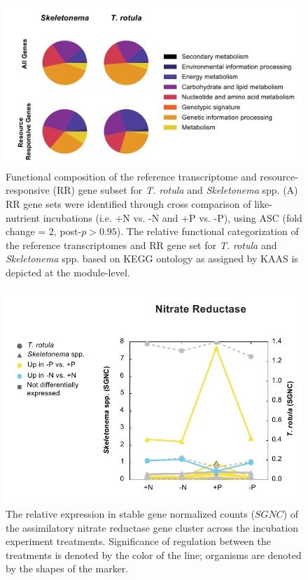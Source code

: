 \begin{figure}[p!]
  \centering
    \includegraphics[width=1\textwidth]{Images/C3_SFigure5_RR_All_Genes_Pie.pdf}
    \caption[Functional compoosition of the reference transcriptome and resource-responsive gene sets]{Functional composition of the reference transcriptome and resource-responsive (RR) gene subset for \textit{T. rotula} and \textit{Skeletonema} spp. (A) RR gene sets were identified through cross comparison of like-nutrient incubations (i.e. +N vs. -N and +P vs. -P), using ASC (fold change = 2, post-$p > 0.95$). The relative functional categorization of the reference transcriptomes and RR gene set for \textit{T. rotula} and \textit{Skeletonema} spp. based on KEGG ontology as assigned by KAAS is depicted at the module-level.}
  \label{fig:a3f5}
\end{figure}


\begin{figure}[p!]
  \centering
    \includegraphics[width=1\textwidth]{Images/C3_SFigure6_SGNC_NitrateReductase.pdf}
    \caption[Relative expression of nitrate reducatses across incubation experiments]{The relative expression in stable gene normalized counts ($SGNC$) of the assimilatory nitrate reductase gene cluster across the incubation experiment treatments. Significance of regulation between the treatments is denoted by the color of the line; organisms are denoted by the shapes of the marker.}
  \label{fig:a3f6}
\end{figure}


